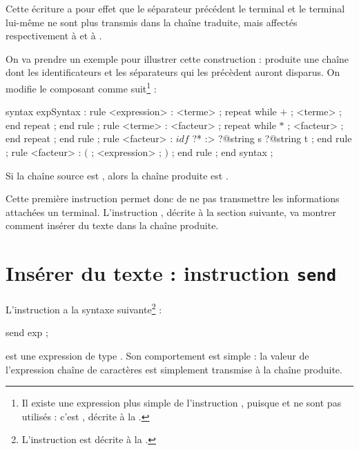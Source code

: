 Cette écriture a pour effet que le séparateur précédent le terminal et le terminal lui-même ne sont plus transmis dans la chaîne traduite, mais affectés respectivement à  et à .

On va prendre un exemple pour illustrer cette construction : produite une chaîne dont les identificateurs et les séparateurs qui les précèdent auront disparus. On modifie le composant  comme suit\footnote{Il existe une expression plus simple de l'instruction , puisque  et  ne sont pas utilisés : c'est , décrite  à la .} :
\begin{galgascode}
syntax expSyntax :
  rule <expression> :
    <terme> ;
    repeat while $+$ ; <terme> ; end repeat ;
  end rule ;
  rule <terme> :
    <facteur> ;
    repeat while $*$ ; <facteur> ; end repeat ;
  end rule ;
  rule <facteur> :
    $idf$ ?* :> ?@string s ?@string t ;
  end rule ;
  rule <facteur> :
    $($ ;
    <expression> ;
    $)$ ;
  end rule ;
end syntax ;
\end{galgascode}

Si la chaîne source est , alors la chaîne produite est .

Cette première instruction permet donc de ne pas transmettre les informations attachées un terminal. L'instruction , décrite à la section suivante, va montrer comment insérer du texte dans la chaîne produite.










\section{Insérer du texte : instruction \texttt{send}}

L'instruction  a la syntaxe suivante\footnote{L'instruction  est décrite à la .} :
\begin{galgascode}
send exp ;
\end{galgascode}

 est une expression de type . Son comportement est simple : la valeur de l'expression chaîne de caractères est simplement transmise à la chaîne produite.

